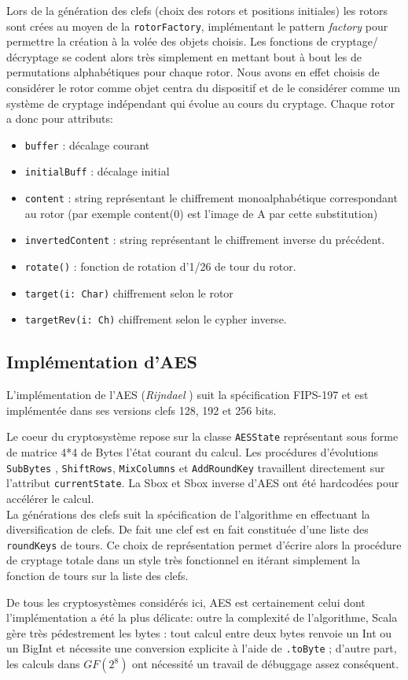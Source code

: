 \documentclass[11pt]{article} %
\begin{document}
Lors de la génération des clefs (choix des rotors et positions initiales) les rotors sont crées au moyen de la \texttt{rotorFactory}, implémentant le pattern \emph{factory} pour permettre la création à la volée des objets choisis.  Les fonctions de cryptage/ décryptage se codent alors très simplement en mettant bout à bout les  de permutations alphabétiques pour chaque rotor. Nous avons en effet choisis de considérer le rotor comme objet centra du dispositif et de le considérer comme un système de cryptage indépendant qui évolue au cours du cryptage. Chaque rotor a donc pour attributs: 
\begin{itemize}
  \item \texttt{buffer} : décalage courant
  \item \texttt{initialBuff}  : décalage initial
  \item \texttt{content}   : string représentant le chiffrement monoalphabétique correspondant au rotor (par exemple content(0) est l'image de A par cette substitution) 
  \item \texttt{invertedContent} : string représentant le chiffrement inverse du précédent.
  \item \texttt{rotate()} : fonction de rotation d'1/26 de tour du rotor.
  \item \texttt{target(i: Char)}  chiffrement selon le rotor
  \item \texttt{targetRev(i: Ch)} chiffrement selon le cypher inverse.

\end{itemize}

\subsection{Implémentation d'AES}
L'implémentation de l'AES (\emph{Rijndael} ) suit la spécification FIPS-197  et est implémentée dans ses versions clefs 128, 192 et 256 bits.

 Le coeur du cryptosystème repose sur la classe \texttt{AESState} représentant sous forme de matrice 4*4 de Bytes l'état courant du calcul. Les procédures d'évolutions \texttt{SubBytes} , \texttt{ShiftRows}, \texttt{MixColumns} et \texttt{AddRoundKey} travaillent directement sur l'attribut \texttt{currentState}. La Sbox et Sbox inverse d'AES ont été hardcodées pour accélérer le calcul. \\

La générations des clefs suit la spécification de l'algorithme en effectuant la diversification de clefs. De fait une clef est en fait constituée d'une liste des \texttt{roundKeys} de tours.  Ce choix de représentation permet d'écrire alors la procédure de cryptage totale dans un style très fonctionnel en itérant simplement la fonction de tours sur la liste des clefs.

De tous les cryptosystèmes considérés ici, AES est certainement celui dont l'implémentation a été la plus délicate: outre la complexité de l'algorithme,  Scala gère très pédestrement les bytes : tout calcul entre deux bytes renvoie un Int ou un BigInt et nécessite une conversion explicite à l'aide de \texttt{.toByte} ; d'autre part, les calculs dans ${GF}(2^8)$ ont nécessité un travail de débuggage assez conséquent. %
\end{document}

